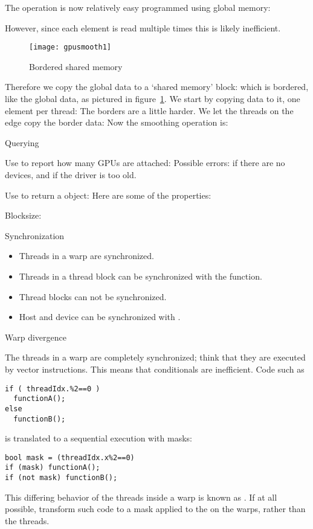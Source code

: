 The operation is now relatively easy programmed using global memory:

However, since each element is read multiple times this is likely inefficient.
\begin{figure}[ht]
  \texttt{[image: gpusmooth1]}
  \caption{Bordered shared memory}
  \label{fig:cusmooth1}
\end{figure}
Therefore we copy the global data to a `shared memory' block:
which is bordered, like the global data,
as pictured in figure~\ref{fig:cusmooth1}.
We start by copying data to it, one element per thread:
The borders are a little harder. We let the threads on the edge
copy the border data:
Now the smoothing operation is:

 {Querying}
\label{sec:cu-properties}

Use  to report how many \acp{GPU} are attached:
Possible errors:  if there are no devices,
and  if the driver is too old.

Use 
to return a  object:
Here are some of the properties:

Blocksize:

 {Synchronization}

\begin{itemize}
\item Threads in a warp are synchronized.
\item Threads in a thread block can be synchronized
  with the  function.
\item Thread blocks can not be synchronized.
\item Host and device can be synchronized
  with .
\end{itemize}

 {Warp divergence}

The threads in a warp are completely synchronized;
think that they are executed by vector instructions.
This means that conditionals are inefficient.
Code such as
\begin{lstlisting}
if ( threadIdx.%2==0 )
  functionA();
else
  functionB();
\end{lstlisting}
is translated to a sequential execution with masks:
\begin{lstlisting}
bool mask = (threadIdx.x%2==0)
if (mask) functionA();
if (not mask) functionB();
\end{lstlisting}
This differing behavior of the threads inside a warp is known as
.
If at all possible, transform such code
to a mask applied to the on the warps,
rather than the threads.

